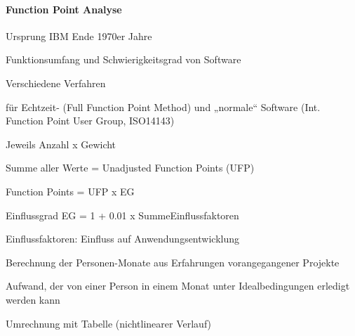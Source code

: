 \documentclass[a4paper]{article}
\begin{document}
\begin{multicols}{3}
  \paragraph{Function Point Analyse}
  \begin{itemize*}
    \item Ursprung IBM Ende 1970er Jahre
    \item Funktionsumfang und Schwierigkeitsgrad von Software
    \item Verschiedene Verfahren
          \begin{itemize*}
            \item für Echtzeit- (Full Function Point Method) und „normale“ Software (Int. Function Point User Group, ISO14143)
          \end{itemize*}
    \item Jeweils Anzahl x Gewicht
    \item Summe aller Werte = Unadjusted Function Points (UFP)
    \item Function Points = UFP x EG
    \item Einflussgrad EG = 1 + 0.01 x SummeEinflussfaktoren
    \item Einflussfaktoren: Einfluss auf Anwendungsentwicklung
    \item Berechnung der Personen-Monate aus Erfahrungen vorangegangener Projekte
          \begin{itemize*}
            \item Aufwand, der von einer Person in einem Monat unter Idealbedingungen erledigt werden kann
          \end{itemize*}
    \item Umrechnung mit Tabelle (nichtlinearer Verlauf)
  \end{itemize*}


\end{multicols}
\end{document}
